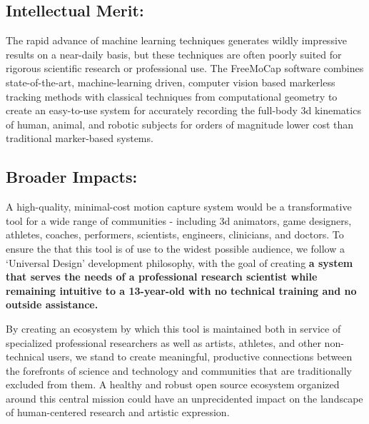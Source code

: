 \subsection{Intellectual Merit:}

\noindent The rapid advance of machine learning techniques generates wildly impressive results on a near-daily basis, but these techniques are often poorly suited for rigorous scientific research or professional use. The FreeMoCap software combines state-of-the-art, machine-learning driven, computer vision based markerless tracking methods with classical techniques from computational geometry to create an easy-to-use system for accurately recording the full-body 3d kinematics of human, animal, and robotic subjects for orders of magnitude lower cost than traditional marker-based systems. 

\subsection{ Broader Impacts: }

A high-quality, minimal-cost motion capture system would be a transformative tool for a wide range of communities - including 3d animators, game designers, athletes, coaches, performers, scientists, engineers, clinicians, and doctors. To ensure the that this tool is of use to the widest possible audience, we follow a `Universal Design' development philosophy, with the goal of creating \textbf{a system that serves the needs of a professional research scientist while remaining intuitive to a 13-year-old with no technical training and no outside assistance.}

By creating an ecosystem by which this tool is maintained both in service of specialized professional researchers as well as artists, athletes, and other non-technical users, we stand to create meaningful, productive connections between the forefronts of science and technology and communities that are traditionally excluded from them. A healthy and robust open source ecosystem organized around this central mission could have an unprecidented impact on the landscape of human-centered research and artistic expression. 